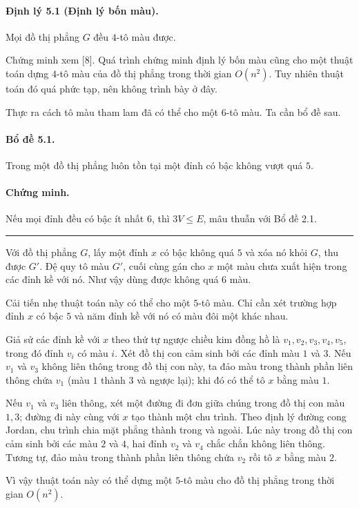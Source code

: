 \documentclass[11pt]{article}
\begin{document}
\paragraph{Định lý 5.1 (Định lý bốn màu).}
Mọi đồ thị phẳng $G$ đều $4$-tô màu được.

Chứng minh xem [8]. Quá trình chứng minh định lý bốn màu cũng cho một thuật
toán dựng $4$-tô màu của đồ thị phẳng trong thời gian $O(n^2)$. Tuy nhiên thuật
toán đó quá phức tạp, nên không trình bày ở đây.

Thực ra cách tô màu tham lam đã có thể cho một $6$-tô màu. Ta cần bổ đề sau.

\paragraph{Bổ đề 5.1.}
Trong một đồ thị phẳng luôn tồn tại một đỉnh có bậc không vượt quá $5$.

\paragraph{Chứng minh.}
Nếu mọi đỉnh đều có bậc ít nhất $6$, thì $3V\le E$, mâu thuẫn với Bổ đề 2.1.
\hfill\rule{0.55em}{0.55em}

Với đồ thị phẳng $G$, lấy một đỉnh $x$ có bậc không quá $5$ và xóa nó khỏi $G$,
thu được $G'$. Đệ quy tô màu $G'$, cuối cùng gán cho $x$ một màu chưa xuất hiện
trong các đỉnh kề với nó. Như vậy dùng được không quá $6$ màu.

Cải tiến nhẹ thuật toán này có thể cho một $5$-tô màu. Chỉ cần xét trường hợp
đỉnh $x$ có bậc $5$ và năm đỉnh kề với nó có màu đôi một khác nhau.

Giả sử các đỉnh kề với $x$ theo thứ tự ngược chiều kim đồng hồ là
$v_1,v_2,v_3,v_4,v_5$, trong đó đỉnh $v_i$ có màu $i$. Xét đồ thị con cảm sinh
bởi các đỉnh màu $1$ và $3$. Nếu $v_1$ và $v_3$ không liên thông trong đồ thị
con này, ta đảo màu trong thành phần liên thông chứa $v_1$ (màu $1$ thành $3$
và ngược lại); khi đó có thể tô $x$ bằng màu $1$.

Nếu $v_1$ và $v_3$ liên thông, xét một đường đi đơn giữa chúng trong đồ thị con
màu $1,3$; đường đi này cùng với $x$ tạo thành một chu trình. Theo định lý đường
cong Jordan, chu trình chia mặt phẳng thành trong và ngoài. Lúc này trong đồ
thị con cảm sinh bởi các màu $2$ và $4$, hai đỉnh $v_2$ và $v_4$ chắc chắn
không liên thông. Tương tự, đảo màu trong thành phần liên thông chứa $v_2$ rồi
tô $x$ bằng màu $2$.

Vì vậy thuật toán này có thể dựng một $5$-tô màu cho đồ thị phẳng trong thời
gian $O(n^2)$.
\end{document}
